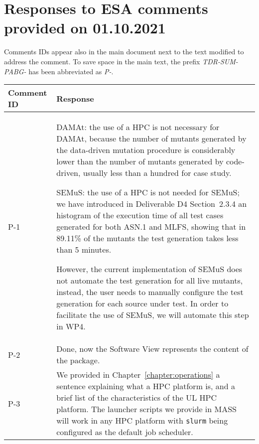 
\section{Responses to ESA comments provided on 01.10.2021}
\label{sec:ESA:comments:2}

Comments IDs appear also in the main document next to the text modified to address the comment. To save space in the main text, the prefix \emph{TDR-SUM-PABG-} has been abbreviated as \emph{P-}.

\setlength\LTleft{0pt}
\setlength\LTright{0pt}
\footnotesize
\begin{longtable}{|p{1.5cm}|p{12cm}|@{}}
\textbf{Comment ID}&\textbf{Response}\\
\hline
P-1&
\begin{minipage}{12cm}
DAMAt: the use of a HPC is not necessary for DAMAt, because the number of mutants generated by the data-driven mutation procedure is considerably lower than the number of mutants generated by code-driven, usually less than a hundred for case study.

SEMuS: the use of a HPC is not needed for SEMuS; we have introduced in Deliverable D4 Section~2.3.4 an histogram of the execution time of all test cases generated for both ASN.1 and MLFS, showing that in 89.11\% of the mutants the test generation takes less than 5 minutes.

However, the current implementation of SEMuS does not automate the test generation for all live mutants, instead, the user needs to manually configure the test generation for each source under test. In order to facilitate the use of SEMuS, we will automate this step in WP4.
\end{minipage}\\
\hline

P-2&
\begin{minipage}{12cm}
Done, now the Software View represents the content of the package.
\end{minipage}\\
\hline

P-3&
\begin{minipage}{12cm}
We provided in Chapter~\ref{chapter:operations} a sentence explaining what a HPC platform is, and a brief list of the characteristics of the UL HPC platform.
The launcher scripts we provide in MASS will work in any HPC platform with \texttt{slurm} being configured as the default job scheduler.
\end{minipage}\\
\hline


\end{longtable}
